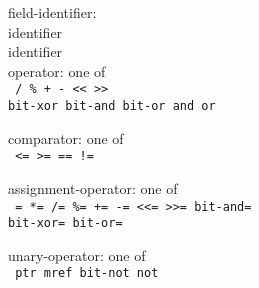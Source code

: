 \documentclass[a4j,twocolumn]{article}
\begin{document}
\noindent
field-identifier: \\
\quad identifier \\
\quad {\tt ->} identifier \\

\noindent
operator: {\rm one of} \\ \tt
\quad * / \% + - << >> \\
\quad bit-xor bit-and bit-or and or \\ \it

\noindent
comparator: {\rm one of} \\ \tt
\quad < > <= >= == != \\ \it

\noindent
assignment-operator: {\rm one of} \\ \tt
\quad = *= /= \%= += -= <<= >>= bit-and= \\
\quad bit-xor= bit-or= \\ \it

\noindent
unary-operator: {\rm one of} \\ \tt
\quad ptr mref bit-not not \\ \it
\end{document}
